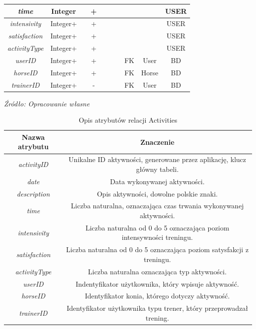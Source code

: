 \documentclass[12pt,twoside]{report}
\begin{document}
\begin{enumerate}[start=1,label={\bfseries REL\textbackslash0\arabic*}]
\begin{table}[H]
\begin{tabular}{|c|c|c|c|c|c|c|c|c|c|}
			\hline
			\textit{time} & Integer & & + & & & & & &USER\\
			\hline
			\textit{intensivity}  & Integer+ & & + & & & & & &USER\\
			\hline
			\textit{satisfaction} & Integer+ & & + & & & & & &USER\\
			\hline
			\textit{activityType} & Integer+ & & + & & & & & &USER\\
			\hline
			\textit{userID} & Integer+ & & + & & & &FK&User&BD\\
			\hline	
			\textit{horseID} & Integer+ & & + & & & &FK&Horse&BD\\
			\hline
			\textit{trainerID} & Integer+ & & - & & & &FK&User&BD\\
			\hline		
		\end{tabular}
	\end{table}

	\begin{table}[H]
	\caption{Opis atrybutów relacji Activities}
	\textit{Źródło: Opracowanie własne}
	\label{ActivityAttributeDescription}
	\centering
	\begin{tabular}{|c|c|}
\hline
Nazwa atrybutu & Znaczenie \\
\hline
\textit{activityID} & Unikalne ID aktywności, generowane przez aplikację, klucz główny tabeli. \\
\hline
\textit{date} &  Data wykonywanej aktywności.\\
\hline
\textit{description} & Opis aktywności, dowolne polskie znaki.\\
\hline
\textit{time} & Liczba naturalna, oznaczająca czas trwania wykonywanej aktywności.\\
\hline
\textit{intensivity}  & Liczba naturalna od 0 do 5 oznaczająca poziom intensywności treningu.\\
\hline
\textit{satisfaction} & Liczba naturalna od 0 do 5 oznaczająca poziom satysfakcji z treningu.\\
\hline
\textit{activityType} &  Liczba naturalna oznaczająca typ aktywności.\\
			\hline
\textit{userID} & Indentyfikator użytkownika, który wpisuje aktywność.\\
\hline	
\textit{horseID} & Identyfikator konia, którego dotyczy aktywność.\\
\hline
\textit{trainerID} & Identyfikator użytkownika typu trener, który przeprowadzał trening.\\
\hline
	\end{tabular}
\end{table}


\end{enumerate}
\end{document}
